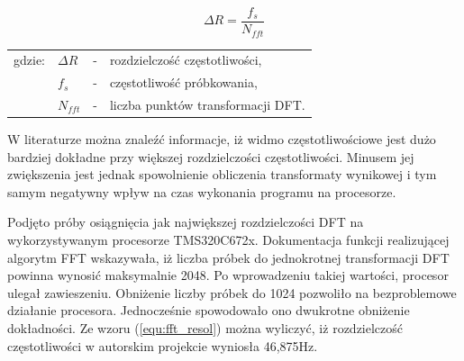 \begin{equation} \label{equ:fft_resol}
\Delta R = \frac{f_{s}}{N_{fft}}
\end{equation}
\begin{tabular}{ l l l l}
	gdzie: 	&	$\Delta R$ & - &  rozdzielczość częstotliwości, \\
	&	$f_{s}$ & - &  częstotliwość próbkowania, \\
	&   $N_{fft}$ &  - & liczba punktów transformacji DFT. \\
\end{tabular}

W literaturze można znaleźć informacje, iż widmo częstotliwościowe jest dużo bardziej dokładne przy większej rozdzielczości częstotliwości. Minusem jej zwiększenia jest jednak spowolnienie obliczenia transformaty wynikowej i tym samym negatywny wpływ na czas wykonania programu na procesorze.

Podjęto próby osiągnięcia jak największej rozdzielczości DFT na wykorzystywanym procesorze TMS320C672x. Dokumentacja funkcji realizującej algorytm FFT wskazywała, iż liczba próbek do jednokrotnej transformacji DFT powinna wynosić maksymalnie 2048. Po wprowadzeniu takiej wartości, procesor ulegał zawieszeniu. Obniżenie liczby próbek do 1024 pozwoliło na bezproblemowe działanie procesora. Jednocześnie spowodowało ono dwukrotne obniżenie dokładności. Ze wzoru (\ref{equ:fft_resol}) można wyliczyć, iż rozdzielczość częstotliwości w autorskim projekcie wyniosła 46,875Hz.


